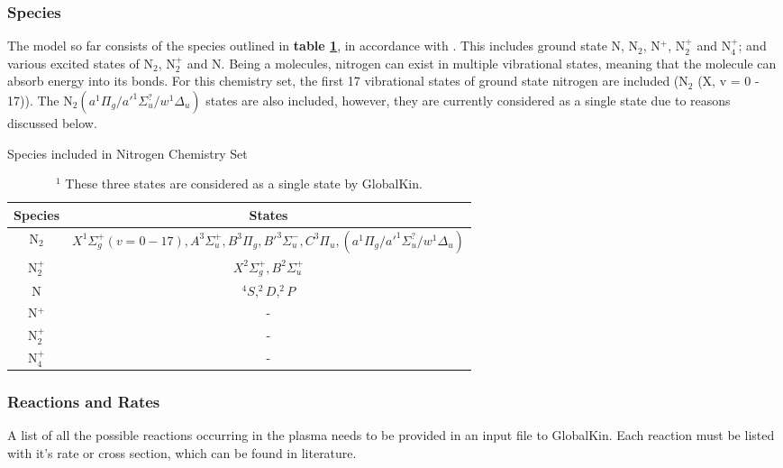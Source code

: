 \documentclass[11pt, oneside]{article}   	%
\begin{document}
\subsubsection{Species}

The model so far consists of the species outlined in \textbf{table \ref{table:Species}}, in accordance with \cite{Kutasi2016tuning}.
This includes ground state N, N$_2$, N$^+$, N$_2^+$ and N$_4^+$; and various excited states of N$_2$, N$_2^+$ and N.
Being a molecules, nitrogen can exist in multiple vibrational states, meaning that the molecule can absorb energy into its bonds.
For this chemistry set, the first 17 vibrational states of ground state nitrogen are included (N$_2$ (X, v = 0 - 17)).
The N$_2 (a^1\Pi_g/a'^1\Sigma^?_u/w^1\Delta_u)$ states are also included, however, they are currently considered as a single state due to reasons discussed below.



\begin{table}
\caption{Species included in Nitrogen Chemistry Set}
\begin{center}
\begin{tabular}{| c | c |}
\hline
Species & States \\
\hline\hline \hline
N$_2$ & $X^1\Sigma_g^+  (v = 0 - 17),  A^3\Sigma_u^+, B^3\Pi_g, B'^3\Sigma_u^-, C^3\Pi_u, (a^1\Pi_g/a'^1\Sigma^?_u/w^1\Delta_u)$\footnotemark  \\
\hline
N$_2^+$ & $X^2\Sigma_g^+, B^2\Sigma_u^+ $ \\
\hline
N & $^4S, ^2D,  ^2P$ \\
\hline
N$^+$ & - \\
\hline
N$_2^+$ & - \\
\hline
N$_4^+$ & - \\
\hline
\end{tabular}
\end{center}
\label{table:Species}
\caption*{$^1$ These three states are considered as a single state by GlobalKin.}
\end{table}


\subsubsection{Reactions and Rates}

A list of all the possible reactions occurring in the plasma needs to be provided in an input file to GlobalKin.
Each reaction must be listed with it's rate or cross section, which can be found in literature.
\end{document}
